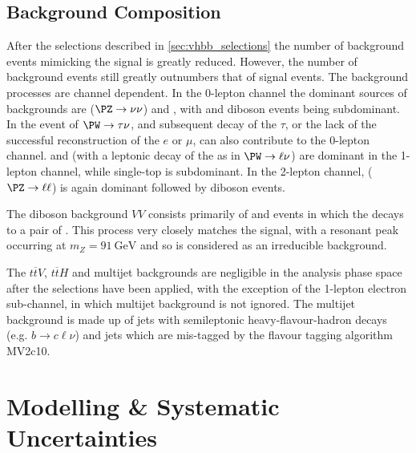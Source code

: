 \subsection{Background Composition}\label{sec:vebb_background_composition}

After the selections described in \cref{sec:vhbb_selections} the number of background events mimicking the \VHbb signal is greatly reduced.
However, the number of background events still greatly outnumbers that of signal events.
The background processes are channel dependent.
In the 0-lepton channel the dominant sources of backgrounds are \Zjets ($\Zboson \to \nu\nu$) and \ttbar, with \Wjets and diboson events being subdominant.
In the event of $\Wboson \to \tau\nu$, and subsequent decay of the $\tau$, or the lack of the successful reconstruction of the $e$ or $\mu$, \Wjets can also contribute to the 0-lepton channel.
\ttbar and \Wjets (with a leptonic decay of the \Wboson as in $\Wboson \to \ell\nu$) are dominant in the 1-lepton channel, while single-top is subdominant.
In the 2-lepton channel, \Zjets ($\Zboson \to \ell\ell$) is again dominant followed by \Zboson\Zboson diboson events.

The diboson background $VV$ consists primarily of \Wboson\Zboson and \Zboson\Zboson events in which the \Zboson decays to a pair of \bquarks.
This process very closely matches the signal, with a resonant peak occurring at $m_Z = \SI{91}{\GeV}$ and so is considered as an 
irreducible background.

The $t\overline{t} V$, $t\overline{t} H$ and multijet backgrounds are negligible in the analysis phase space after the selections have been applied, with the exception of the 1-lepton electron sub-channel, in which multijet background is not ignored.
The multijet background is made up of jets with semileptonic heavy-flavour-hadron decays (e.g. $b \to c \ell \nu$) and jets which are mis-tagged by the flavour tagging algorithm MV2c10.


\section{Modelling \& Systematic Uncertainties}\label{sec:vhbb_modelling}



